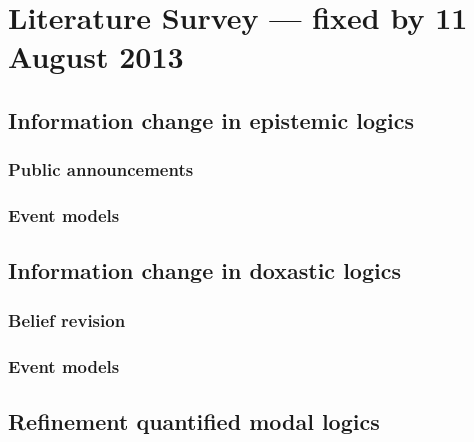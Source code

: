 \section{Literature Survey --- fixed by 11 August 2013}

\subsection{Information change in epistemic logics}
\subsubsection{Public announcements}
\subsubsection{Event models}

\subsection{Information change in doxastic logics}
\subsubsection{Belief revision}
\subsubsection{Event models}

\subsection{Refinement quantified modal logics}
